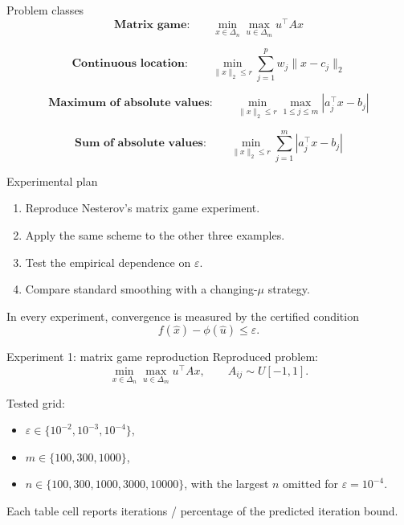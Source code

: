 \documentclass[aspectratio=169]{beamer}
\begin{document}
\begin{frame}{Problem classes}
\small
  \[
  \textbf{Matrix game:}\qquad
  \min_{x\in\Delta_n}\max_{u\in\Delta_m}u^\top Ax
  \]

  \[
  \textbf{Continuous location:}\qquad
  \min_{\|x\|_2\le r}\sum_{j=1}^{p}w_j\|x-c_j\|_2
  \]

  \[
  \textbf{Maximum of absolute values:}\qquad
  \min_{\|x\|_2\le r}\max_{1\le j\le m}|a_j^\top x-b_j|
  \]

  \[
  \textbf{Sum of absolute values:}\qquad
  \min_{\|x\|_2\le r}\sum_{j=1}^{m}|a_j^\top x-b_j|
  \]
\end{frame}

\begin{frame}{Experimental plan}
  \begin{enumerate}
    \item Reproduce Nesterov's matrix game experiment.
    \item Apply the same scheme to the other three examples.
    \item Test the empirical dependence on $\varepsilon$.
    \item Compare standard smoothing with a changing-$\mu$ strategy.
  \end{enumerate}

  \vspace{0.6em}
  In every experiment, convergence is measured by the certified condition
  \[
      f(\hat x)-\phi(\hat u)\le\varepsilon.
  \]
\end{frame}

\begin{frame}{Experiment 1: matrix game reproduction}
  Reproduced problem:
  \[
      \min_{x\in\Delta_n}\max_{u\in\Delta_m}u^\top Ax,
      \qquad A_{ij}\sim U[-1,1].
  \]

  \vspace{0.5em}
  Tested grid:
  \begin{itemize}
    \item $\varepsilon\in\{10^{-2},10^{-3},10^{-4}\}$,
    \item $m\in\{100,300,1000\}$,
    \item $n\in\{100,300,1000,3000,10000\}$, with the largest $n$ omitted for $\varepsilon=10^{-4}$.
  \end{itemize}

  \vspace{0.5em}
  Each table cell reports iterations / percentage of the predicted iteration bound.
\end{frame}
\end{document}
